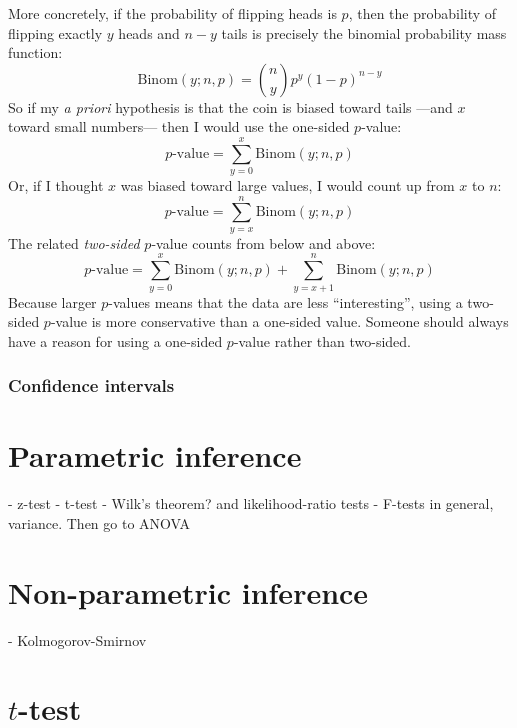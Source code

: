 More concretely, if the probability of flipping heads is $p$, then the probability of flipping exactly $y$ heads and $n - y$ tails is precisely the binomial probability mass function:
\begin{equation}
\mathrm{Binom}(y; n, p) = \binom{n}{y} p^y (1-p)^{n-y}
\end{equation}
So if my \textit{a priori} hypothesis is that the coin is biased toward tails ---and $x$ toward small numbers--- then I would use the one-sided $p$-value:
\begin{equation}
\text{$p$-value} = \sum_{y=0}^x \mathrm{Binom}(y; n, p)
\end{equation}
Or, if I thought $x$ was biased toward large values, I would count up from $x$ to $n$:
\begin{equation}
\text{$p$-value} = \sum_{y=x}^n \mathrm{Binom}(y; n, p)
\end{equation}
The related \textit{two-sided} $p$-value counts from below and above:
\begin{equation}
\text{$p$-value} = \sum_{y=0}^x \mathrm{Binom}(y; n, p) + \sum_{y=x + 1}^n \mathrm{Binom}(y; n, p)
\end{equation}
Because larger $p$-values means that the data are less ``interesting'', using a two-sided $p$-value is more conservative than a one-sided value. Someone should always have a reason for using a one-sided $p$-value rather than two-sided.

\subsubsection{Confidence intervals}

\section{Parametric inference}

- z-test
- t-test
- Wilk's theorem? and likelihood-ratio tests
- F-tests in general, variance. Then go to ANOVA

\section{Non-parametric inference}

- Kolmogorov-Smirnov

\section{$t$-test}

